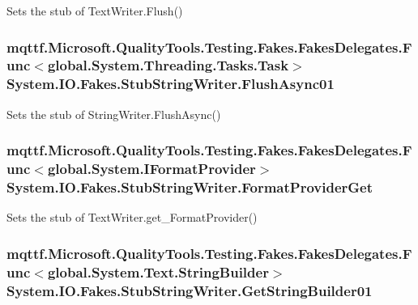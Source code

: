 Sets the stub of Text\-Writer.\-Flush()

\hypertarget{class_system_1_1_i_o_1_1_fakes_1_1_stub_string_writer_ac38954429488bde1f2f2dca56f1ff1db}{
\subsubsection[{Flush\-Async01}]{\setlength{\rightskip}{0pt plus 5cm}mqttf.\-Microsoft.\-Quality\-Tools.\-Testing.\-Fakes.\-Fakes\-Delegates.\-Func$<$global.\-System.\-Threading.\-Tasks.\-Task$>$ System.\-I\-O.\-Fakes.\-Stub\-String\-Writer.\-Flush\-Async01}}\label{class_system_1_1_i_o_1_1_fakes_1_1_stub_string_writer_ac38954429488bde1f2f2dca56f1ff1db}


Sets the stub of String\-Writer.\-Flush\-Async()

\hypertarget{class_system_1_1_i_o_1_1_fakes_1_1_stub_string_writer_afc0e19fc6a0db335d6698c5d13254d0b}{
\subsubsection[{Format\-Provider\-Get}]{\setlength{\rightskip}{0pt plus 5cm}mqttf.\-Microsoft.\-Quality\-Tools.\-Testing.\-Fakes.\-Fakes\-Delegates.\-Func$<$global.\-System.\-I\-Format\-Provider$>$ System.\-I\-O.\-Fakes.\-Stub\-String\-Writer.\-Format\-Provider\-Get}}\label{class_system_1_1_i_o_1_1_fakes_1_1_stub_string_writer_afc0e19fc6a0db335d6698c5d13254d0b}


Sets the stub of Text\-Writer.\-get\-\_\-\-Format\-Provider()

\hypertarget{class_system_1_1_i_o_1_1_fakes_1_1_stub_string_writer_a032bd2d99dca4c697b02506aded113d2}{
\subsubsection[{Get\-String\-Builder01}]{\setlength{\rightskip}{0pt plus 5cm}mqttf.\-Microsoft.\-Quality\-Tools.\-Testing.\-Fakes.\-Fakes\-Delegates.\-Func$<$global.\-System.\-Text.\-String\-Builder$>$ System.\-I\-O.\-Fakes.\-Stub\-String\-Writer.\-Get\-String\-Builder01}}\label{class_system_1_1_i_o_1_1_fakes_1_1_stub_string_writer_a032bd2d99dca4c697b02506aded113d2}


